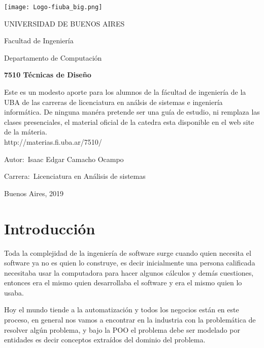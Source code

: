 \documentclass[12pt]{book}
\begin{document}
\thispagestyle{empty}

\begin {center}

\texttt{[image: Logo-fiuba\_big.png]}

\medskip
UNIVERSIDAD DE BUENOS AIRES

Facultad de Ingenier\'ia

Departamento de Computaci\'on


\vspace{3cm}


\textbf{\large 7510 T\'ecnicas de Diseño}

\vspace{2cm}


Este es un modesto aporte para los alumnos de la f\'acultad de ingenier\'ia  de la UBA de las carreras de licenciatura en an\'alsis de sistemas e ingenier\'ia inform\'atica.
De ninguna man\'era pretende ser una gu\'ia de estudio, ni remplaza las clases presenciales, el material oficial de la catedra esta disponible en el web site de la m\'ateria.
\\
http://materias.fi.uba.ar/7510/

\end {center}


\vspace{2.5cm}

\noindent Autor:\,	Isaac Edgar Camacho Ocampo
 
\noindent Carrera:\,	Licenciatura en An\'alisis de sistemas

\vspace{1cm}

\vspace{1cm}

\noindent Buenos Aires, 2019

\newpage


\tableofcontents

\chapter{Introducción}
Toda la complejidad de la ingeniería de software surge cuando quien necesita el software ya no es quien lo construye, es decir inicialmente una persona calificada necesitaba usar la computadora para hacer algunos cálculos y demás cuestiones, entonces era el mismo quien desarrollaba el software y era el mismo quien lo usaba.

Hoy el mundo tiende a la automatización y todos los negocios están en este proceso, en general nos vamos a encontrar en la industria con la problemática de resolver algún problema, y bajo la POO el problema debe ser modelado por entidades es decir conceptos extraídos del dominio del problema.
\end{document}
